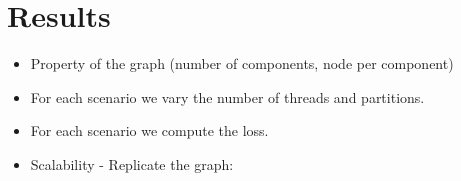 \section{Results}
\begin{itemize}
\item Property of the graph (number of components, node per component)

\item For each scenario we vary the number of threads and partitions. 

\item For each scenario we compute the loss. 

\item Scalability - Replicate the graph:
\end{itemize}

\begin{table}

\end{table}


